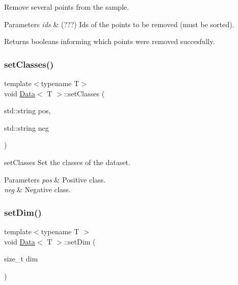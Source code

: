 Remove several points from the sample. 


\begin{DoxyParams}{Parameters}
{\em ids} & (???) Ids of the points to be removed (must be sorted). \\
\hline
\end{DoxyParams}
\begin{DoxyReturn}{Returns}
booleans informing which points were removed succesfully. 
\end{DoxyReturn}
\mbox{\label{class_data_a6d29f9fc923c3f7c258b93330130f056}} 
\subsubsection{\texorpdfstring{set\+Classes()}{setClasses()}}
{\footnotesize\ttfamily template$<$typename T$>$ \\
void \hyperlink{class_data}{Data}$<$ T $>$\+::set\+Classes (\begin{DoxyParamCaption}\item[{std\+::string}]{pos,  }\item[{std\+::string}]{neg }\end{DoxyParamCaption})}



set\+Classes Set the classes of the dataset. 


\begin{DoxyParams}{Parameters}
{\em pos} & Positive class. \\
\hline
{\em neg} & Negative class. \\
\hline
\end{DoxyParams}
\mbox{\label{class_data_ad6e602802e593e4700b3746de55f890b}} 
\subsubsection{\texorpdfstring{set\+Dim()}{setDim()}}
{\footnotesize\ttfamily template$<$typename T $>$ \\
void \hyperlink{class_data}{Data}$<$ T $>$\+::set\+Dim (\begin{DoxyParamCaption}\item[{size\+\_\+t}]{dim }\end{DoxyParamCaption})}



